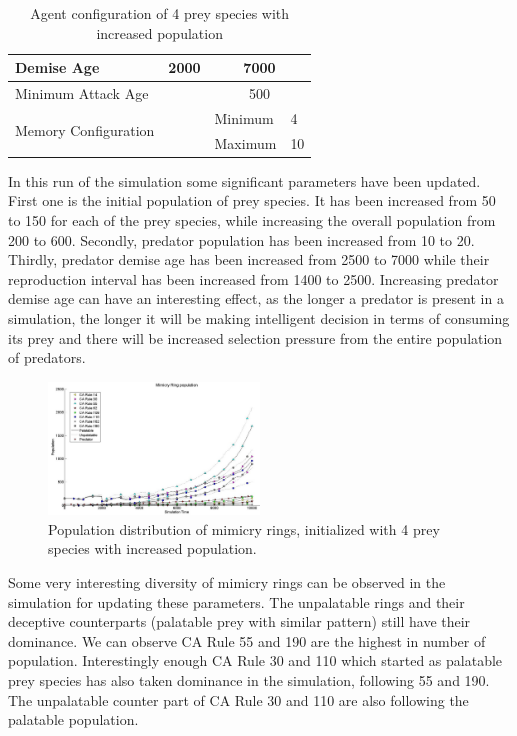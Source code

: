 \documentclass[letterpaper]{article}
\numberwithin{equation}{section}
\begin{document}
\begin{table}[h]
\begin{tabular}{| p{2cm} | p{1.5cm} | p{1cm} | p{.5cm} | p{1.5cm} | p{.5cm} |}
  Demise Age	 									 & \multicolumn{3}{c|}{2000}							& \multicolumn{2}{c|}{7000} \\ \hline
  Minimum Attack Age						 & \multicolumn{3}{c|}{} 						    & \multicolumn{2}{c|}{500} \\ \hline
  \multirow{2}{*}{\parbox{2cm}{Memory Configuration}} & \multicolumn{3}{c|}{} 					& Minimum & 4 \\ \cline{5-6}
   																			& \multicolumn{3}{c|}{} 					& Maximum & 10 \\ \hline  
\end{tabular}
\caption{Agent configuration of 4 prey species with increased population}
\label{tab:config-table-4-more-prey}
\end{table}

In this run of the simulation some significant parameters have been updated. First one is the initial population of prey species. It has been increased from 50 to 150 for each of the prey species, while increasing the overall population from 200 to 600. Secondly, predator population has been increased from 10 to 20. Thirdly, predator demise age has been increased from 2500 to 7000 while their reproduction interval has been increased from 1400 to 2500. Increasing predator demise age can have an interesting effect, as the longer a predator is present in a simulation, the longer it will be making intelligent decision in terms of consuming its prey and there will be increased selection pressure from the entire population of predators. 

\begin{figure}[H]
	\centering
	\includegraphics[width=0.5\textwidth]{../tex/images/simTime10K-4MorePrey}
	\caption[Population distribution of mimicry rings (4 prey species, increased population)]{Population distribution of mimicry rings, initialized with 4 prey species with increased population.}
	\label{fig:plot-4-more-prey}
\end{figure}

Some very interesting diversity of mimicry rings can be observed in the simulation for updating these parameters. The unpalatable rings and their deceptive counterparts (palatable prey with similar pattern) still have their dominance. We can observe CA Rule 55 and 190 are the highest in number of population. Interestingly enough CA Rule 30 and 110 which started as palatable prey species has also taken dominance in the simulation, following 55 and 190. The unpalatable counter part of CA Rule 30 and 110 are also following the palatable population. 
\end{document}
